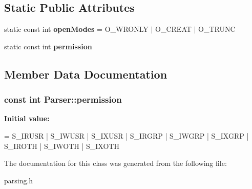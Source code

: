 \subsection*{Static Public Attributes}
\begin{DoxyCompactItemize}
\item 
\hypertarget{classParser_a8f85c6ebdc3937e218696884ed03533c}{static const int {\bfseries open\-Modes} = O\-\_\-\-W\-R\-O\-N\-L\-Y $\vert$ O\-\_\-\-C\-R\-E\-A\-T $\vert$ O\-\_\-\-T\-R\-U\-N\-C}\label{classParser_a8f85c6ebdc3937e218696884ed03533c}

\item 
static const int {\bfseries permission}
\end{DoxyCompactItemize}


\subsection{Member Data Documentation}
\hypertarget{classParser_a98de978c6d394f8abdb64c538975a95f}{
\subsubsection[{permission}]{\setlength{\rightskip}{0pt plus 5cm}const int Parser\-::permission\hspace{0.3cm}{\ttfamily [static]}}}\label{classParser_a98de978c6d394f8abdb64c538975a95f}
{\bfseries Initial value\-:}
\begin{DoxyCode}
=
            S\_IRUSR | S\_IWUSR | S\_IXUSR | S\_IRGRP | S\_IWGRP | S\_IXGRP | S\_IROTH | S\_IWOTH | S\_IXOTH
\end{DoxyCode}


The documentation for this class was generated from the following file\-:\begin{DoxyCompactItemize}
\item 
parsing.\-h\end{DoxyCompactItemize}

